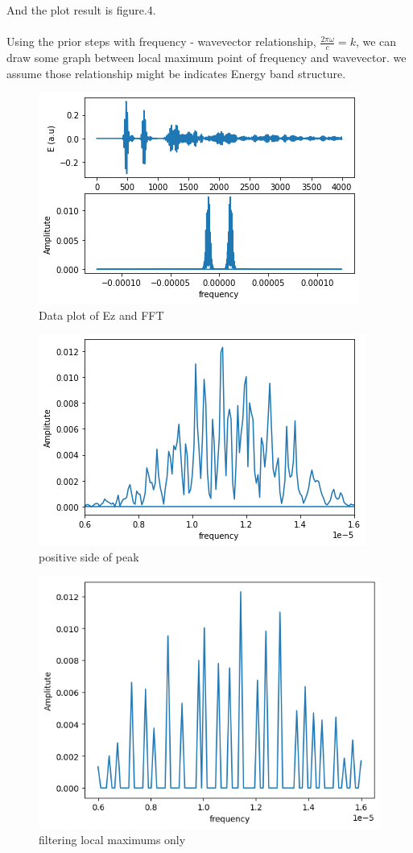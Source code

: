 \documentclass{article}
\begin{document}
And the plot result is figure.4.
\\
\\
Using the prior steps with frequency - wavevector relationship, $\frac{2\pi \omega}{c}=k$, 
we can draw some graph between local maximum point of frequency and wavevector. we assume those relationship might be indicates Energy band structure.

 \begin{figure}[h]
    \centerline{\includegraphics[width=\columnwidth]{202306181.png}}
    \caption{Data plot of Ez and FFT}
    \label{figure_2} 
\end{figure}
\begin{figure}[h]
    \centerline{\includegraphics[width=\columnwidth]{202306182.png}}
    \caption{positive side of peak}
    \label{figure_3} 
\end{figure}
\begin{figure}[h]
    \centerline{\includegraphics[width=\columnwidth]{202306183.png}}
    \caption{filtering local maximums only}
    \label{figure_4} 
\end{figure}
\end{document}
